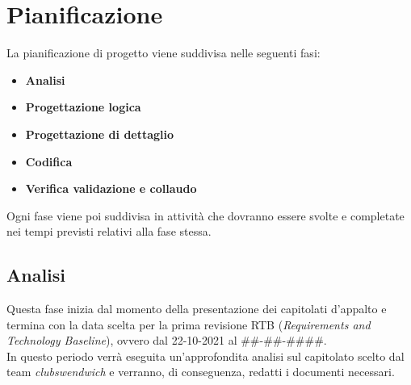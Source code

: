 \section{Pianificazione}
La pianificazione di progetto viene suddivisa nelle seguenti fasi:
\begin{itemize}
    \item \textbf{Analisi}
    \item \textbf{Progettazione logica}
    \item \textbf{Progettazione di dettaglio}
    \item \textbf{Codifica}
    \item \textbf{Verifica validazione e collaudo}
\end{itemize} 
Ogni fase viene poi suddivisa in attività che dovranno essere svolte e completate nei tempi previsti relativi alla fase stessa.

\subsection{Analisi}
Questa fase inizia dal momento della presentazione dei capitolati d'appalto e termina con la data scelta per la prima revisione RTB (\textit{Requirements and Technology Baseline}), ovvero dal 22-10-2021 al \#\#-\#\#-\#\#\#\#.\\ %
In questo periodo verrà eseguita un'approfondita analisi sul capitolato scelto dal team \textit{clubswendwich} e verranno, di conseguenza, redatti i documenti necessari.

